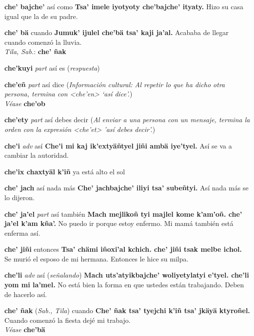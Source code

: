 \documentclass[10pt]{scrbook}
\newcommand{\entry}[1]{\textbf{#1}}
\newcommand{\partofspeech}[1]{\textit{#1}}
\newcommand{\spanishtranslation}[1]{#1}
\newcommand{\clarification}[1]{(\textit{#1})}
\newcommand{\cholexample}[1]{\textbf{#1}}
\newcommand{\exampletranslation}[1]{#1}
\newcommand{\dialectvariant}[1]{\\\textit{#1}:}
\newcommand{\dialectword}[1]{\textbf{#1}}
\newcommand{\alsosee}[1]{\\\textit{Véase} \textbf{#1}}
\newcommand{\relevantdialect}[1]{(\textit{#1})}
\newcommand{\culturalinformation}[1]{(\textit{#1})}
\begin{document}
\begin{multicols}{2}
\entry{che' bajche'}
\spanishtranslation{así como}
\cholexample{Tsa' imele iyotyoty che'bajche' ityaty.}
\exampletranslation{Hizo su casa igual que la de su padre.}

\entry{che' bä}
\spanishtranslation{cuando}
\cholexample{Jumuk' ijulel che'bä tsa' kaji ja'al.}
\exampletranslation{Acababa de llegar cuando comenzó la lluvia.}
\dialectvariant{Tila, Sab.}
\dialectword{che' ñak}

\entry{che'kuyi}
\partofspeech{part}
\spanishtranslation{así es}
\clarification{respuesta}

\entry{che'eñ}
\partofspeech{part}
\spanishtranslation{así dice}
\culturalinformation{Información cultural: Al repetir lo que ha dicho otra persona, termina con <che'en> ‘así dice’.}
\alsosee{che'ob}

\entry{che'ety}
\partofspeech{part}
\spanishtranslation{así debes decir}
\clarification{Al enviar a una persona con un mensaje, termina la orden con la expresión <che'et> 'así debes decir'.}

\entry{che'i}
\partofspeech{adv}
\spanishtranslation{así}
\cholexample{Che'i mi kaj ik'extyäñtyel jiñi ambä iye'tyel.}
\exampletranslation{Así se va a cambiar la autoridad.}

\entry{che'ix chaxtyäl k'iñ}
\spanishtranslation{ya está alto el sol}

\entry{che' jach}
\spanishtranslation{así nada más}
\cholexample{Che' jachbajche' iliyi tsa' subeñtyi.}
\exampletranslation{Así nada más se lo dijeron.}

\entry{che' ja'el}
\partofspeech{part}
\spanishtranslation{así también}
\cholexample{Mach mejlikoñ tyi majlel kome k'am'oñ. che' ja'el k'am kña'.}
\exampletranslation{No puedo ir porque estoy enfermo. Mi mamá también está enferma así.}

\entry{che' jiñi}
\spanishtranslation{entonces}
\cholexample{Tsa' chämi iñoxi'al kchich. che' jiñi tsak melbe ichol.}
\exampletranslation{Se murió el esposo de mi hermana. Entonces le hice su milpa.}

\entry{che'li}
\partofspeech{adv}
\spanishtranslation{así}
\clarification{señalando}
\cholexample{Mach uts'atyikbajche' woliyetylatyi e'tyel. che'li yom mi la'mel.}
\exampletranslation{No está bien la forma en que ustedes están trabajando. Deben de hacerlo así.}

\entry{che' ñak}
\relevantdialect{Sab., Tila}
\spanishtranslation{cuando}
\cholexample{Che' ñak tsa' tyejchi k'iñ tsa' jkäyä ktyroñel.}
\exampletranslation{Cuando comenzó la fiesta dejé mi trabajo.}
\alsosee{che'bä}


\end{multicols}
\end{document}
